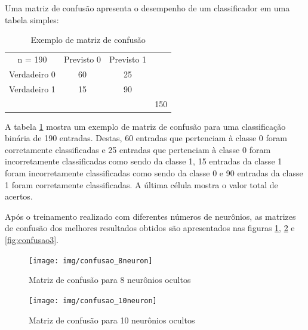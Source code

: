 \documentclass[10pt,a4paper]{article}
\begin{document}
\begin{multicols*}{2}
Uma matriz de confusão  apresenta o desempenho de um classificador em uma tabela simples:

\begin{table}[H]
\centering
\begin{tabular}{ccc|l}
\cline{2-3}
\multicolumn{1}{c|}{n = 190}       & \multicolumn{1}{c|}{Previsto 0}                 & Previsto 1                 &                                                  \\ \cline{1-3}
\multicolumn{1}{|c|}{Verdadeiro 0} & \multicolumn{1}{c|}{\cellcolor[HTML]{9AFF99}60} & \cellcolor[HTML]{FFCCC9}25 &                                                  \\ \cline{1-3}
\multicolumn{1}{|c|}{Verdadeiro 1} & \multicolumn{1}{c|}{\cellcolor[HTML]{FFCCC9}15} & \cellcolor[HTML]{9AFF99}90 &                                                  \\ \hline
\multicolumn{1}{l}{}               & \multicolumn{1}{l}{}                            & \multicolumn{1}{l|}{}      & \multicolumn{1}{l|}{\cellcolor[HTML]{CBCEFB}150} \\ \cline{4-4} 
\end{tabular}
\caption{Exemplo de matriz de confusão}
\label{tab:confusao_exemplo}
\end{table}

A tabela \ref{tab:confusao_exemplo} mostra um exemplo de matriz de confusão para uma classificação binária de 190 entradas. Destas, 60 entradas que pertenciam à classe 0 foram corretamente classificadas e 25 entradas que pertenciam à classe 0 foram incorretamente classificadas como sendo da classe 1, 15 entradas da classe 1 foram incorretamente classificadas como sendo da classe 0 e 90 entradas da classe 1 foram corretamente classificadas. A última célula mostra o valor total de acertos.

Após o treinamento realizado com diferentes números de neurônios, as matrizes de confusão dos melhores resultados obtidos são apresentados nas figuras \ref{fig:confusao1}, \ref{fig:confusao2} e \ref{fig:confusao3}.
\begin{figure}[H]
	\centering
	\texttt{[image: img/confusao\_8neuron]}
	\caption{Matriz de confusão para 8 neurônios ocultos}
	\label{fig:confusao1}
\end{figure}

\begin{figure}[H]
	\centering
	\texttt{[image: img/confusao\_10neuron]}
	\caption{Matriz de confusão para 10 neurônios ocultos}
	\label{fig:confusao2}
\end{figure}


\end{multicols*}
\end{document}
